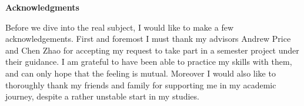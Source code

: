 \thispagestyle{empty}

\vspace*{20mm}

\begin{center}
    {\textbf{\large Acknowledgments} }
\end{center}



\noindent Before we dive into the real subject, I would like to make a few acknowledgements. First and foremost I must thank my advisors Andrew Price and Chen Zhao for accepting my request to take part in a semester project under their guidance. I am grateful to have been able to practice my skills with them, and can only hope that the feeling is mutual. Moreover I would also like to thoroughly thank my friends and family for supporting me in my academic journey, despite a rather unstable start in my studies.

\cleardoublepage{}
